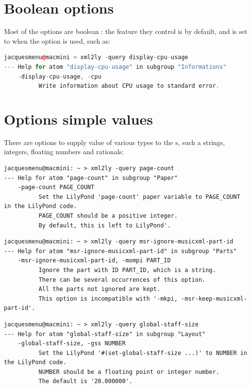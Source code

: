 \section{Boolean options}\label{Boolean options}

Most of the options are boolean : the feature they control is  by default, and is set to  when the option is used, such as:
\begin{lstlisting}[language=C++]
jacquesmenu@macmini > xml2ly -query display-cpu-usage
--- Help for atom "display-cpu-usage" in subgroup "Informations"
    -display-cpu-usage, -cpu
          Write information about CPU usage to standard error.
\end{lstlisting}

\section{Options simple values}\label{Options simple values}

There are options to supply value of various types to the \service s, such a strings, integers, floating numbers and rationals:
\begin{lstlisting}[language=Terminal]
jacquesmenu@macmini: ~ > xml2ly -query page-count
--- Help for atom "page-count" in subgroup "Paper"
    -page-count PAGE_COUNT
          Set the LilyPond 'page-count' paper variable to PAGE_COUNT in the LilyPond code.
          PAGE_COUNT should be a positive integer.
          By default, this is left to LilyPond'.
\end{lstlisting}

\begin{lstlisting}[language=Terminal]
jacquesmenu@macmini: ~ > xml2ly -query msr-ignore-musicxml-part-id
--- Help for atom "msr-ignore-musicxml-part-id" in subgroup "Parts"
    -msr-ignore-musicxml-part-id, -mompi PART_ID
          Ignore the part with ID PART_ID, which is a string.
          There can be several occurrences of this option.
          All the parts not ignored are kept.
          This option is incompatible with '-mkpi, -msr-keep-musicxml-part-id'.
\end{lstlisting}

\begin{lstlisting}[language=Terminal]
jacquesmenu@macmini: ~ > xml2ly -query global-staff-size
--- Help for atom "global-staff-size" in subgroup "Layout"
    -global-staff-size, -gss NUMBER
          Set the LilyPond '#(set-global-staff-size ...)' to NUMBER in the LilyPond code.
          NUMBER should be a floating point or integer number.
          The default is '20.000000'.
\end{lstlisting}

